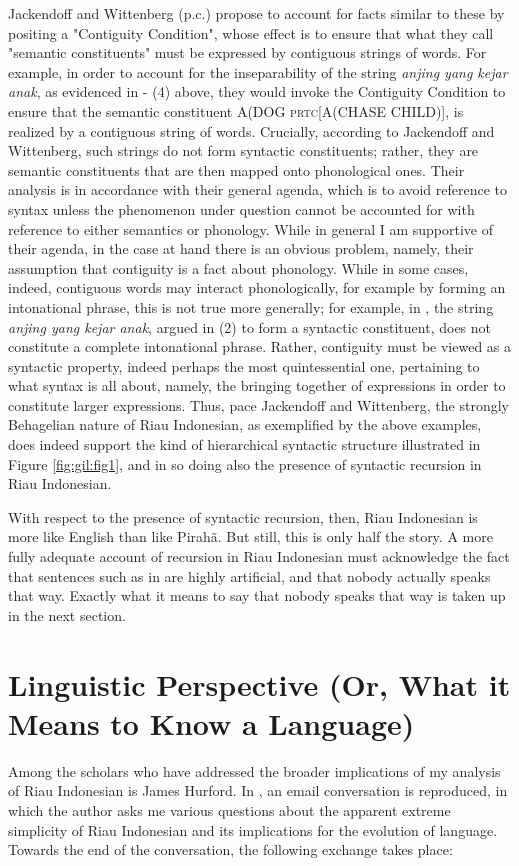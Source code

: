 \documentclass[output=paper,colorlinks,citecolor=brown
]{langscibook}
\begin{document}
Jackendoff and Wittenberg (p.c.) propose to account for facts similar to these by positing a "Contiguity Condition", whose effect is to ensure that what they call "semantic constituents" must be expressed by contiguous strings of words.  For example, in order to account for the inseparability of the string \emph{anjing yang kejar anak}, as evidenced in  - (4) above, they would invoke the Contiguity Condition to ensure that the semantic constituent A(DOG \textsc{prtc}[A(CHASE CHILD)], is realized by a contiguous string of words.  Crucially, according to Jackendoff and Wittenberg, such strings do not form syntactic constituents; rather, they are semantic constituents that are then mapped onto phonological ones.  Their analysis is in accordance with their general agenda, which is to avoid reference to syntax unless the phenomenon under question cannot be accounted for with reference to either semantics or phonology.  While in general I am supportive of their agenda, in the case at hand there is an obvious problem, namely, their assumption that contiguity is a fact about phonology.  While in some cases, indeed, contiguous words may interact phonologically, for example by forming an intonational phrase, this is not true more generally; for example, in , the string \emph{anjing yang kejar anak}, argued in (2) to form a syntactic constituent, does not constitute a complete intonational phrase.  Rather, contiguity must be viewed as a syntactic property, indeed perhaps the most quintessential one, pertaining to what syntax is all about, namely, the bringing together of expressions in order to constitute larger expressions.  Thus, pace Jackendoff and Wittenberg, the strongly Behagelian nature of Riau Indonesian, as exemplified by the above examples, does indeed support the kind of hierarchical syntactic structure illustrated in Figure \ref{fig:gil:fig1}, and in so doing also the presence of syntactic recursion in Riau Indonesian.

With respect to the presence of syntactic recursion, then, Riau Indonesian is more like English than like Pirahã.  But still, this is only half the story.  A more fully adequate account of recursion in Riau Indonesian must acknowledge the fact that sentences such as in  are highly artificial, and that nobody actually speaks that way.  Exactly what it means to say that nobody speaks that way is taken up in the next section.

\section{Linguistic Perspective (Or, What it Means to Know a Language)}
Among the scholars who have addressed the broader implications of my analysis of Riau Indonesian is James Hurford. In \citet[410-413]{hurford2011origins}, an email conversation is reproduced, in which the author asks me various questions about the apparent extreme simplicity of Riau Indonesian and its implications for the evolution of language.  Towards the end of the conversation, the following exchange takes place:
\end{document}

